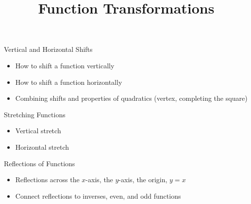 \documentclass{ximera}
\author{}
\title{Function Transformations}
\begin{document}
\begin{abstract}
\end{abstract}
\maketitle


\begin{objectives}

\item Vertical and Horizontal Shifts 
\begin{itemize}
	\item How to shift a function vertically
	\item How to shift a function horizontally
	\item Combining shifts and properties of quadratics (vertex, completing the square)
\end{itemize}

\item Stretching Functions
\begin{itemize}
	\item Vertical stretch
	\item Horizontal stretch
\end{itemize}


\item Reflections of Functions
\begin{itemize}
	\item Reflections across the $x$-axis, the $y$-axis, the origin, $y=x$
	\item Connect reflections to inverses, even, and odd functions
\end{itemize}


\end{objectives}
\end{document}
